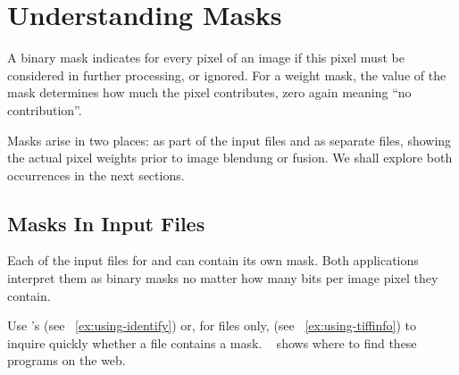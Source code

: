 

\chapter[Understanding Masks\commonpart]{\label{sec:understanding-masks}%
  Understanding Masks\commonpart}

%
%
%
A binary mask indicates for every pixel of an image if this pixel must be considered in further
processing, or ignored.  For a weight mask, the value of the mask determines how much the pixel
contributes, zero again meaning ``no contribution''.

Masks arise in two places: as part of the input files and as separate files, showing the actual
pixel weights prior to image blendung or fusion.  We shall explore both occurrences in the next
sections.


\section[Masks In Input Files]{\label{sec:masks-in-input-files}%
  Masks In Input Files}

Each of the input files for  and  can contain its own
mask.  Both applications interpret them as binary masks no matter how many bits per image pixel
they contain.

Use 's  (see
\exampleName~\ref{ex:using-identify}) or, for  files only,  (see \exampleName~\ref{ex:using-tiffinfo}) to inquire
quickly whether a file contains a mask.  \appendixName~ shows
where to find these programs on the web.

